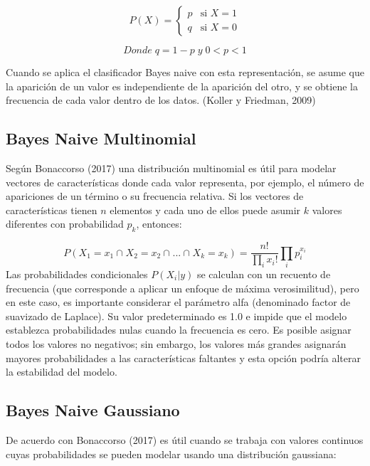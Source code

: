  \[P\left(X\right)=\begin{cases}
      p & \mbox{si } X = 1   \\
      q & \mbox{si } X = 0
   \end{cases}\]

 \[Donde\;q = 1 - p\;y\;0 < p < 1\]

Cuando se aplica el clasificador Bayes naive con esta representación, se asume que la aparición de un valor es independiente de la aparición del otro, y se obtiene la frecuencia de cada valor dentro de los datos. (Koller y Friedman, 2009)

\subsection{Bayes Naive Multinomial}

Según Bonaccorso (2017) una distribución multinomial es útil para modelar vectores de características donde cada valor representa, por ejemplo, el número de apariciones de un término o su frecuencia relativa. Si los vectores de características tienen $n$ elementos y cada uno de ellos puede asumir $k$ valores diferentes con probabilidad $p_{k}$, entonces:

\[
P\left(X_{1}=x_{1} \cap_{}^{} X_{2}=x_{2} \cap_{}^{} ... \cap_{}^{} X_{k}=x_{k} \right) = \frac{n!}{\prod_{i} x_{i}!} \prod_{i} p_{i}^{x_{i}}
\]
Las probabilidades condicionales $P\left(X_{i} | y\right)$ se calculan con un recuento de frecuencia (que corresponde a aplicar un enfoque de máxima verosimilitud), pero en este caso, es importante considerar el parámetro alfa (denominado factor de suavizado de Laplace). Su valor predeterminado es 1.0 e impide que el modelo establezca probabilidades nulas cuando la frecuencia es cero. Es posible asignar todos los valores no negativos; sin embargo, los valores más grandes asignarán mayores probabilidades a las características faltantes y esta opción podría alterar la estabilidad del modelo.

\subsection{Bayes Naive Gaussiano}

De acuerdo con Bonaccorso (2017) es útil cuando se trabaja con valores continuos cuyas probabilidades se pueden modelar usando una distribución gaussiana:

